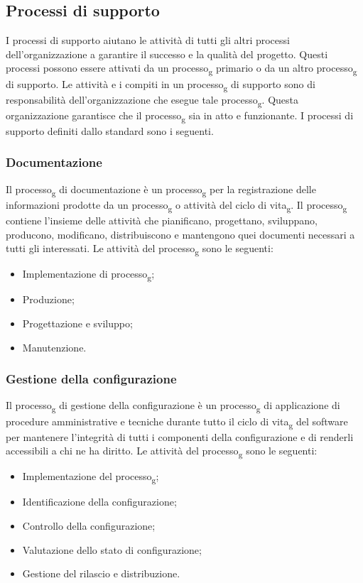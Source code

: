 \subsection{Processi di supporto}
I processi di supporto aiutano le attività di tutti gli altri processi dell'organizzazione a garantire il successo e la qualità del progetto. Questi processi possono essere attivati da un processo\textsubscript{g} primario o da un altro processo\textsubscript{g} di supporto.
Le attività e i compiti in un processo\textsubscript{g} di supporto sono di responsabilità dell'organizzazione che esegue tale processo\textsubscript{g}. Questa organizzazione garantisce che il processo\textsubscript{g} sia in atto e funzionante.
I processi di supporto definiti dallo standard sono i seguenti.
\subsubsection{Documentazione}
Il processo\textsubscript{g} di documentazione è un processo\textsubscript{g} per la registrazione delle informazioni prodotte da un processo\textsubscript{g} o attività del ciclo di vita\textsubscript{g}. Il processo\textsubscript{g} contiene l'insieme delle attività che pianificano, progettano, sviluppano, producono, modificano, distribuiscono e mantengono quei documenti necessari a tutti gli interessati.
Le attività del processo\textsubscript{g} sono le seguenti:
\begin{itemize}
\item Implementazione di processo\textsubscript{g};
\item Produzione;
\item Progettazione e sviluppo;
\item Manutenzione.
\end{itemize}
\subsubsection{Gestione della configurazione}
Il processo\textsubscript{g} di gestione della configurazione è un processo\textsubscript{g} di applicazione di procedure amministrative e tecniche durante tutto il ciclo di vita\textsubscript{g} del software per mantenere l'integrità di tutti i componenti della configurazione e di renderli accessibili a chi ne ha diritto.
Le attività del processo\textsubscript{g} sono le seguenti:
\begin{itemize}
\item Implementazione del processo\textsubscript{g};
\item Identificazione della configurazione;
\item Controllo della configurazione;
\item Valutazione dello stato di configurazione;
\item Gestione del rilascio e distribuzione.
\end{itemize}
